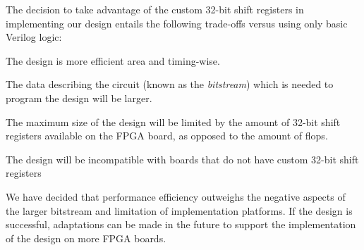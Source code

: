 The decision to take advantage of the custom 32-bit shift registers in implementing our design entails the following trade-offs versus using only basic Verilog logic:
\begin{itemlist}
	\item The design is more efficient area and timing-wise.
	\item The data describing the circuit (known as the \emph{bitstream}) which is needed to program the design will be larger.
	\item The maximum size of the design will be limited by the amount of 32-bit shift registers available on the FPGA board, as opposed to the amount of flops.
	\item The design will be incompatible with boards that do not have custom 32-bit shift registers
\end{itemlist}

We have decided that performance efficiency outweighs the negative aspects of the larger bitstream and limitation of implementation platforms.
If the design is successful, adaptations can be made in the future to support the implementation of the design on more FPGA boards.


